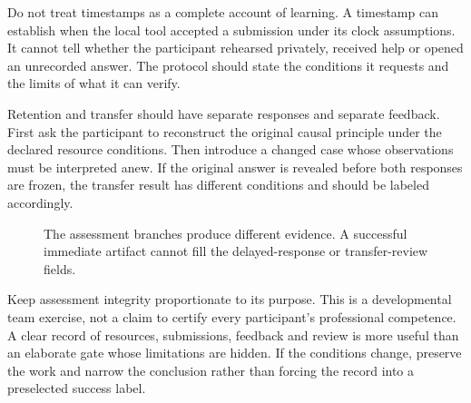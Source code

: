 Do not treat timestamps as a complete account of learning. A timestamp can establish when the local tool accepted a submission under its clock assumptions. It cannot tell whether the participant rehearsed privately, received help or opened an unrecorded answer. The protocol should state the conditions it requests and the limits of what it can verify.

Retention and transfer should have separate responses and separate feedback. First ask the participant to reconstruct the original causal principle under the declared resource conditions. Then introduce a changed case whose observations must be interpreted anew. If the original answer is revealed before both responses are frozen, the transfer result has different conditions and should be labeled accordingly.

\begin{figure}[H]\centering
{}
\caption{The assessment branches produce different evidence. A successful immediate artifact cannot fill the delayed-response or transfer-review fields.}\label{fig:ch13-learning-evidence}
\end{figure}

Keep assessment integrity proportionate to its purpose. This is a developmental team exercise, not a claim to certify every participant's professional competence. A clear record of resources, submissions, feedback and review is more useful than an elaborate gate whose limitations are hidden. If the conditions change, preserve the work and narrow the conclusion rather than forcing the record into a preselected success label.

